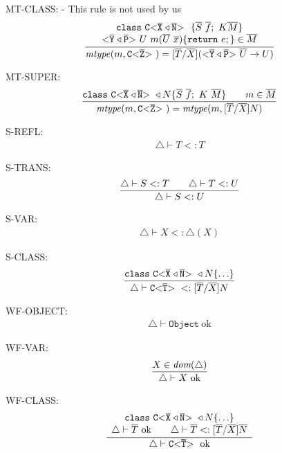 

MT-CLASS: - This rule is not used by us
\begin{align*}
\ddfrac{\begin{array}{c}
\texttt{class} \ \exptype{C}{\ol{X} \triangleleft \ol{N}} \ \{ \ol{S} \ \ol{f}; \ K \ol{M} \}\\
\exptype{}{\ol{Y} \triangleleft \ol{P}} U \ m(\ol{U} \ \ol{x})\{  \texttt{return} \ e; \} \in \ol{M}
\end{array}}
{\mathit{mtype}(m, \exptype{C}{\ol{Z}}) = [\ol{T}/\ol{X}](\exptype{}{\ol{Y} \triangleleft \ol{P}} \ol{U} \to U)}
\end{align*}

MT-SUPER:
\begin{align*}
\frac{\displaystyle \texttt{class}\ \mathtt{C {\tt <} \overline{X} \triangleleft \overline{N} {\tt >} \ } \triangleleft N \{ \overline{S}\ \overline{f};\ K \ \overline{M} \}
\quad \quad m \in \overline{M}}{\displaystyle \mathit{mtype}(m, \mathtt{C {\tt <} \overline{Z} {\tt >} \ }) = \mathit{mtype}(m, [\overline{T}/\overline{X}]N)}
\end{align*}

S-REFL:
\begin{align*}
\triangle \vdash T <: T
\end{align*}

S-TRANS:
\begin{align*}
\frac{\displaystyle 
    \triangle \vdash S <: T \quad \quad \triangle \vdash T <: U
}{\displaystyle 
    \triangle \vdash S <: U
}
\end{align*}

S-VAR:
\begin{align*}
\triangle \vdash X <: \triangle(X)
\end{align*}

S-CLASS:
\begin{align*}
\frac{\displaystyle 
  \texttt{class}\ \mathtt{C {\tt <} \overline{X} \triangleleft \overline{N} {\tt >} \ } \triangleleft N \{  \ldots  \}
}{\displaystyle 
  \triangle \vdash \mathtt{C {\tt <} \overline{T} {\tt >} \ } <: [\overline{T}/\overline{X}]N
}
\end{align*}

WF-OBJECT:
\begin{align*}
\triangle \vdash \texttt{Object}\ \text{ok}
\end{align*}

WF-VAR:
\begin{align*}
\frac{\displaystyle 
    X \in \textit{dom}(\triangle)
}{\displaystyle 
    \triangle \vdash X \ \text{ok}
}
\end{align*}

WF-CLASS:
\begin{align*}
\frac{\displaystyle \begin{array}{c}
\texttt{class}\ \mathtt{C {\tt <} \overline{X} \triangleleft \overline{N} {\tt >} \ } \triangleleft N \{ \ldots \} \\
\triangle \vdash \overline{T} \ \text{ok} \quad \quad \triangle \vdash \overline{T} <: [\overline{T}/\overline{X}]\overline{N}
\end{array}
}{\displaystyle 
\triangle \vdash \mathtt{C {\tt <} \overline{T} {\tt >} \ } \ \text{ok}
}
\end{align*}

